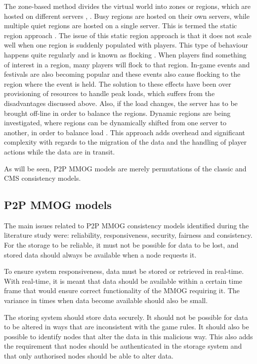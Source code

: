 \documentclass[journal,oneside,a4paper,onecolumn]{IEEEtran}
\begin{document}
The zone-based method divides the virtual world into zones or regions, which are hosted on different servers \cite{zone_based_stat}, \cite{zone_based_dyn}. Busy regions are hosted on their own servers, while multiple quiet regions are hosted on a single server. This is termed the static region approach \cite{zone_based_stat}. The issue of this static region approach is that it does not scale well when one region is suddenly populated with players. This type of behaviour happens quite regularly and is known as flocking \cite{flocking}. When players find something of interest in a region, many players will flock to that region. In-game events and festivals are also becoming popular and these events also cause flocking to the region where the event is held. The solution to these effects have been over provisioning of resources to handle peak loads, which suffers from the disadvantages discussed above. Also, if the load changes, the server has to be brought off-line in order to balance the regions. Dynamic regions are being investigated, where regions can be dynamically shifted from one server to another, in order to balance load \cite{zone_based_dyn}. This approach adds overhead and significant complexity with regards to the migration of the data and the handling of player actions while the data are in transit.

As will be seen, P2P MMOG models are merely permutations of the classic and \ac{CMS} consistency models.

\subsection{P2P MMOG models}

The main issues related to P2P MMOG consistency models identified during the literature study were: reliability, responsiveness, security, fairness and consistency. For the storage to be reliable, it must not be possible for data to be lost, and stored data should always be available when a node requests it.

To ensure system responsiveness, data must be stored or retrieved in real-time. With real-time, it is meant that data should be available within a certain time frame that would ensure correct functionality of the MMOG requiring it. The variance in times when data become available should also be small.

The storing system should store data securely. It should not be possible for data to be altered in ways that are inconsistent with the game rules. It should also be possible to identify nodes that alter the data in this malicious way. This also adds the requirement that nodes should be authenticated in the storage system and that only authorised nodes should be able to alter data.
\end{document}
